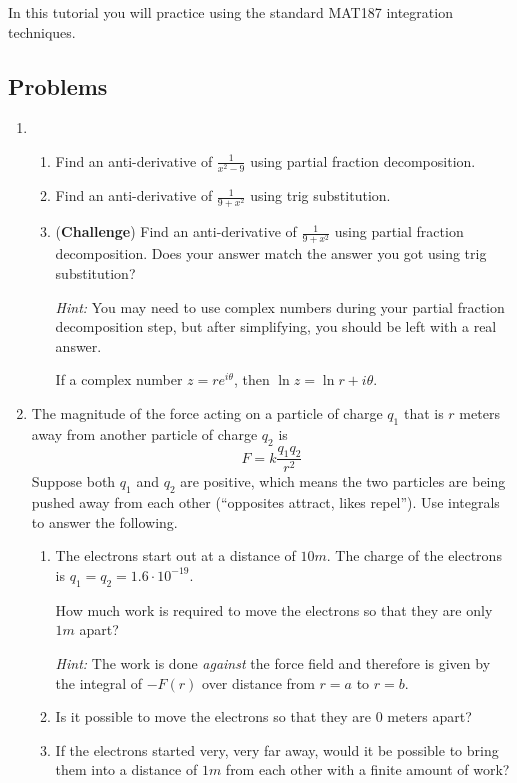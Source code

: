 \begin{objectives}
	In this tutorial you will practice using the standard MAT187 integration techniques.
\end{objectives}

\vspace{-.5em}
\subsection*{Problems}
\vspace{-.5em}


\begin{enumerate}
	\item 
	
\begin{enumerate}
    \item Find an anti-derivative of  $\frac{1}{x^2 - 9}$ using partial fraction decomposition.
    \item Find an anti-derivative of  $\frac{1}{9 + x^2}$ using trig substitution.
    \item (\textbf{Challenge}) Find an anti-derivative of  $\frac{1}{9 + x^2}$ using partial fraction decomposition. Does your answer match the answer you got using trig substitution?

    \emph{Hint:} You may need to use complex numbers during your partial fraction decomposition step, but after simplifying, you should be left with a real answer.

    If a complex number $z=re^{i\theta}$, then $\ln z = \ln r + i\theta$.
\end{enumerate}

\item The magnitude of the force acting on a particle of charge $q_1$ that is $r$ meters away from another particle of charge $q_2$ is
   	\[
	  	F =k\frac{q_1 q_2}{r^2}
   	\]
   	Suppose both $q_1$ and $q_2$ are positive, which means the two particles are being pushed away from each other (``opposites attract, likes repel''). Use integrals to answer the following.
    \begin{enumerate}
        \item The electrons start out at a distance of $10m$.
        The charge of the electrons is $q_1=q_2=1.6\cdot 10^{-19}$.

        How much work is required to move the electrons so that they
        are only $1m$ apart?
        
        \emph{Hint:} The work is done \textit{against} the force field and therefore is given by the integral of $-F(r)$ over distance from $r=a$ to $r=b$.%
        \item Is it possible to move the electrons so that they are $0$ meters apart?
        \item If the electrons started very, very far away, would it be possible to bring them into a distance of $1m$ from each other with a 
        finite amount of work?
    \end{enumerate}


\end{enumerate}
